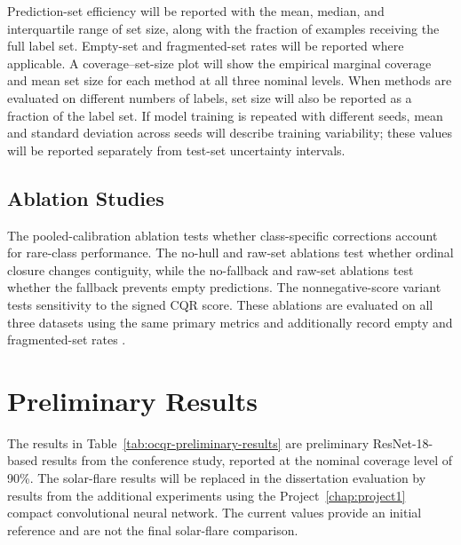 \documentclass[12pt]{report}
\begin{document}
Prediction-set efficiency will be reported with the mean, median, and interquartile range of set size, along with the fraction of examples receiving the full label set. Empty-set and fragmented-set rates will be reported where applicable. A coverage--set-size plot will show the empirical marginal coverage and mean set size for each method at all three nominal levels. When methods are evaluated on different numbers of labels, set size will also be reported as a fraction of the label set. If model training is repeated with different seeds, mean and standard deviation across seeds will describe training variability; these values will be reported separately from test-set uncertainty intervals.

\subsection{Ablation Studies}

The pooled-calibration ablation tests whether class-specific corrections account for rare-class performance. The no-hull and raw-set ablations test whether ordinal closure changes contiguity, while the no-fallback and raw-set ablations test whether the fallback prevents empty predictions. The nonnegative-score variant tests sensitivity to the signed CQR score. These ablations are evaluated on all three datasets using the same primary metrics and additionally record empty and fragmented-set rates \citep{hong2026ocqr}.

\section{Preliminary Results}

The results in Table~\ref{tab:ocqr-preliminary-results} are preliminary ResNet-18-based results from the conference study, reported at the nominal coverage level of 90\%. The solar-flare results will be replaced in the dissertation evaluation by results from the additional experiments using the Project~\ref{chap:project1} compact convolutional neural network. The current values provide an initial reference and are not the final solar-flare comparison.
\end{document}
